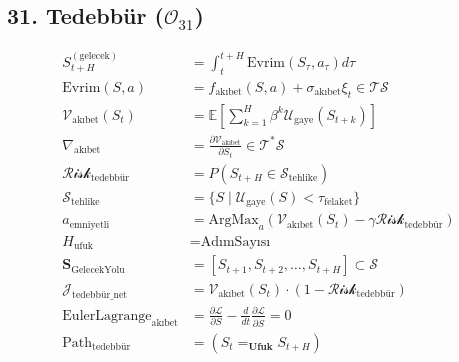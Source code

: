 \documentclass[11pt, a4paper]{article}
\begin{document}
\subsection{31. Tedebbür ($\mathcal{O}_{31}$)}
\begin{align}
S_{t+H}^{(\text{gelecek})} &= \int_t^{t+H} \text{Evrim}(S_\tau, a_\tau) d\tau \\
\text{Evrim}(S, a) &= f_{\text{akıbet}}(S, a) + \sigma_{\text{akıbet}} \xi_t \in \mathcal{T}\mathcal{S} \\
\mathcal{V}_{\text{akıbet}}(S_t) &= \mathbb{E}\left[ \sum_{k=1}^H \beta^k \mathcal{U}_{\text{gaye}}(S_{t+k}) \right] \\
\nabla_{\text{akıbet}} &= \frac{\partial \mathcal{V}_{\text{akıbet}}}{\partial S_t} \in \mathcal{T}^*\mathcal{S} \\
\mathcal{Risk}_{\text{tedebbür}} &= P(S_{t+H} \in \mathcal{S}_{\text{tehlike}}) \\
\mathcal{S}_{\text{tehlike}} &= \{ S \mid \mathcal{U}_{\text{gaye}}(S) < \tau_{\text{felaket}} \} \\
a_{\text{emniyetli}} &= \text{ArgMax}_a \left( \mathcal{V}_{\text{akıbet}}(S_t) - \gamma \mathcal{Risk}_{\text{tedebbür}} \right) \\
H_{\text{ufuk}} &= \text{AdımSayısı} \\
\mathbf{S}_{\text{GelecekYolu}} &= [S_{t+1}, S_{t+2}, \dots, S_{t+H}] \subset \mathcal{S} \\
\mathcal{J}_{\text{tedebbür\_net}} &= \mathcal{V}_{\text{akıbet}}(S_t) \cdot (1 - \mathcal{Risk}_{\text{tedebbür}}) \\
\text{EulerLagrange}_{\text{akıbet}} &= \frac{\partial \mathcal{L}}{\partial S} - \frac{d}{dt} \frac{\partial \mathcal{L}}{\partial \dot{S}} = 0 \\
\text{Path}_{\text{tedebbür}} &= (S_t =_{\mathbf{Ufuk}} S_{t+H})
\end{align}
\end{document}
